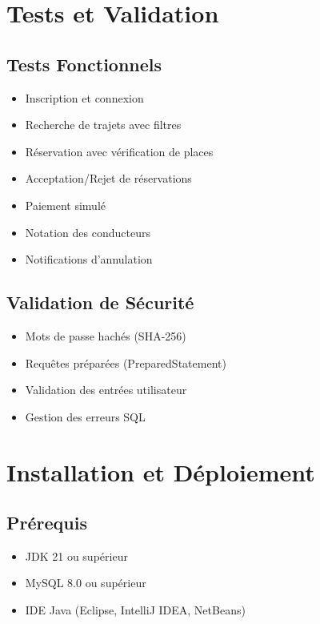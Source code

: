 \documentclass[12pt,a4paper]{report}
\begin{document}
\chapter{Tests et Validation}

\section{Tests Fonctionnels}

\begin{itemize}[label=\checkmark]
    \item Inscription et connexion
    \item Recherche de trajets avec filtres
    \item Réservation avec vérification de places
    \item Acceptation/Rejet de réservations
    \item Paiement simulé
    \item Notation des conducteurs
    \item Notifications d'annulation
\end{itemize}

\section{Validation de Sécurité}

\begin{itemize}[label=\checkmark]
    \item Mots de passe hachés (SHA-256)
    \item Requêtes préparées (PreparedStatement)
    \item Validation des entrées utilisateur
    \item Gestion des erreurs SQL
\end{itemize}

\chapter{Installation et Déploiement}

\section{Prérequis}

\begin{itemize}
    \item JDK 21 ou supérieur
    \item MySQL 8.0 ou supérieur
    \item IDE Java (Eclipse, IntelliJ IDEA, NetBeans)
\end{itemize}
\end{document}
